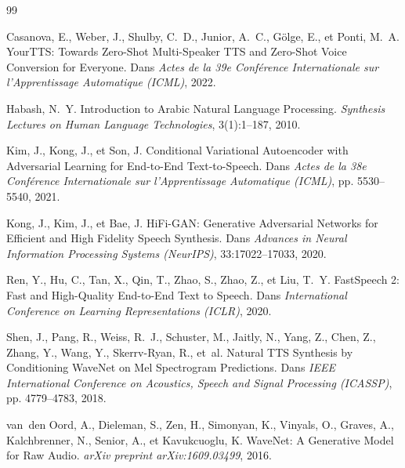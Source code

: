 \documentclass[12pt,a4paper]{article}
\begin{document}
\newpage


\begin{thebibliography}{99}

Casanova, E., Weber, J., Shulby, C.~D., Junior, A.~C., G{\"o}lge, E., et Ponti, M.~A.
\newblock YourTTS: Towards Zero-Shot Multi-Speaker TTS and Zero-Shot Voice Conversion for Everyone.
\newblock Dans \emph{Actes de la 39e Conférence Internationale sur l'Apprentissage Automatique (ICML)}, 2022.

Habash, N.~Y.
\newblock Introduction to Arabic Natural Language Processing.
\newblock \emph{Synthesis Lectures on Human Language Technologies}, 3(1):1--187, 2010.

Kim, J., Kong, J., et Son, J.
\newblock Conditional Variational Autoencoder with Adversarial Learning for End-to-End Text-to-Speech.
\newblock Dans \emph{Actes de la 38e Conférence Internationale sur l'Apprentissage Automatique (ICML)}, pp. 5530--5540, 2021.

Kong, J., Kim, J., et Bae, J.
\newblock HiFi-GAN: Generative Adversarial Networks for Efficient and High Fidelity Speech Synthesis.
\newblock Dans \emph{Advances in Neural Information Processing Systems (NeurIPS)}, 33:17022--17033, 2020.

Ren, Y., Hu, C., Tan, X., Qin, T., Zhao, S., Zhao, Z., et Liu, T.~Y.
\newblock FastSpeech 2: Fast and High-Quality End-to-End Text to Speech.
\newblock Dans \emph{International Conference on Learning Representations (ICLR)}, 2020.

Shen, J., Pang, R., Weiss, R.~J., Schuster, M., Jaitly, N., Yang, Z., Chen, Z., Zhang, Y., Wang, Y., Skerrv-Ryan, R., et~al.
\newblock Natural TTS Synthesis by Conditioning WaveNet on Mel Spectrogram Predictions.
\newblock Dans \emph{IEEE International Conference on Acoustics, Speech and Signal Processing (ICASSP)}, pp. 4779--4783, 2018.

van~den Oord, A., Dieleman, S., Zen, H., Simonyan, K., Vinyals, O., Graves, A., Kalchbrenner, N., Senior, A., et Kavukcuoglu, K.
\newblock WaveNet: A Generative Model for Raw Audio.
\newblock \emph{arXiv preprint arXiv:1609.03499}, 2016.


\end{thebibliography}
\end{document}
